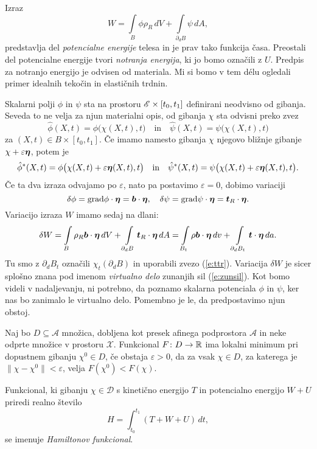 Izraz
\begin{equation*}
	W = \int\limits_{B}\phi\rho_R\, dV + \int\limits_{\partial_d B}\psi\, dA,
\end{equation*}
predstavlja del \emph{potencialne energije} telesa in je prav tako funkcija časa.
Preostali del potencialne energije tvori \emph{notranja energija}, ki jo bomo označili z $U$.
Predpis za notranjo energijo je odvisen od materiala. Mi si bomo v tem délu ogledali primer
idealnih tekočin in elastičnih trdnin. 

Skalarni polji $\phi$ in $\psi$ sta na prostoru $\mathscr E\times [t_0,t_1]$ definirani neodvisno od gibanja.
Seveda to ne velja za njun materialni opis, od gibanja $\chi$ sta odvisni preko zvez
\[ \hat{\phi}(X,t)=\phi\big(\chi(X,t),t\big)\quad\textrm{in}\quad\hat{\psi}(X,t)=\psi\big(\chi(X,t),t\big) \]
za $(X,t)\in B\times [t_0,t_1]$.
Če imamo namesto gibanja $\chi$ njegovo bližnje gibanje $\chi+\varepsilon\boldsymbol \eta$, potem je
\[
	\hat{\phi}^*(X,t)=\phi\big(\chi(X,t)+\varepsilon\boldsymbol \eta(X,t),t\big)\quad\textrm{in}
	\quad\hat{\psi}^*(X,t)=\psi\big(\chi(X,t)+\varepsilon\boldsymbol \eta(X,t),t\big).
\]
Če ta dva izraza odvajamo po $\varepsilon$, nato pa postavimo $\varepsilon=0$, dobimo variaciji
\[
	\delta\phi=\mathrm{grad}\phi\cdot\boldsymbol \eta=\boldsymbol b\cdot\boldsymbol \eta,\quad
	\delta\psi=\mathrm{grad}\psi\cdot\boldsymbol \eta=\boldsymbol t_R\cdot\boldsymbol \eta.
\]
Variacijo izraza $W$ imamo sedaj na dlani:
\[
	\delta W = \int\limits_{B}\rho_R\boldsymbol b\cdot\boldsymbol \eta\, dV + \int\limits_{\partial_d B}\boldsymbol t_R\cdot\boldsymbol \eta\, dA=
	\int\limits_{B_t}\rho\boldsymbol b\cdot\boldsymbol \eta\, dv + \int\limits_{\partial_d B_t}\boldsymbol t\cdot\boldsymbol \eta\, da.
\]
Tu smo z $\partial_d B_t$ označili $\chi_t(\partial_d B)$ in uporabili zvezo (\ref{e:ttr}).
Variacija $\delta W$ je sicer splošno znana
pod imenom \emph{virtualno delo} zunanjih sil (\ref{e:zunsil}). Kot bomo videli v nadaljevanju,
ni potrebno, da poznamo skalarna potenciala $\phi$ in $\psi$, ker nas bo zanimalo le virtualno delo.
Pomembno je le, da predpostavimo njun obstoj.

\begin{definicija}
	Naj bo $D\subseteq\mathcal{A}$ množica, dobljena kot presek afinega podprostora $\mathcal{A}$ in
	neke odprte množice v prostoru $\mathcal{X}$.
	Funkcional $F\colon D\to\mathbb R$ ima lokalni minimum pri dopustnem gibanju $\chi^{0}\in D$, če obstaja $\varepsilon >0$,
	da za vsak $\chi\in D$, za katerega je $\|\chi-\chi^{0}\|<\varepsilon$, velja $F(\chi^{0})<F(\chi)$.
\end{definicija}

\begin{definicija}
	Funkcional, ki gibanju $\chi\in\mathcal{D}$ s kinetično energijo $T$ in potencialno
	energijo $W+U$ priredi realno število
	\[
		H=\int_{t_0}^{t_1}(T+W+U)\,dt,
	\]
	se imenuje \emph{Hamiltonov funkcional}.
\end{definicija}

